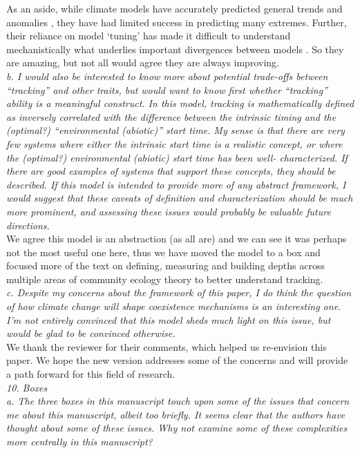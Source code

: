 \documentclass[11pt]{article}
\begin{document}
As an aside, while climate models have accurately predicted general trends and anomalies \citep{hausf2020}, they have had limited success in predicting many extremes. Further, their reliance on model `tuning' has made it difficult to understand mechanistically what underlies important divergences between models \citep{knutti2017ng}. So they are amazing, but not all would agree they are always improving. \\

\emph{b.      I would also be interested to know more about potential trade-offs between ``tracking''
and other traits, but would want to know first whether ``tracking'' ability is a meaningful
construct. In this model, tracking is mathematically defined as inversely correlated with the
difference between the intrinsic timing and the (optimal?) ``environmental (abiotic)'' start
time. My sense is that there are very few systems where either the intrinsic start time is a
realistic concept, or where the (optimal?) environmental (abiotic) start time has been well-
characterized. If there are good examples of systems that support these concepts, they should
be described. If this model is intended to provide more of any abstract framework, I would
suggest that these caveats of definition and characterization should be much more prominent,
and assessing these issues would probably be valuable future directions.}\\

We agree this model is an abstraction (as all are) and we can see it was perhaps not the most useful one here, thus we have moved the model to a box and focused more of the text on defining, measuring and building depths across multiple areas of community ecology theory to better understand tracking.\\

\emph{c.      Despite my concerns about the framework of this paper, I do think the question of how
climate change will shape coexistence mechanisms is an interesting one. I’m not entirely
convinced that this model sheds much light on this issue, but would be glad to be convinced
otherwise.}\\

We thank the reviewer for their comments, which helped us re-envision this paper. We hope the new version addresses some of the concerns and will provide a path forward for this field of research.\\

\emph{10.     Boxes\\
a.      The three boxes in this manuscript touch upon some of the issues that concern me
about this manuscript, albeit too briefly. It seems clear that the authors have thought about
some of these issues. Why not examine some of these complexities more centrally in this
manuscript?}\\
\end{document}
